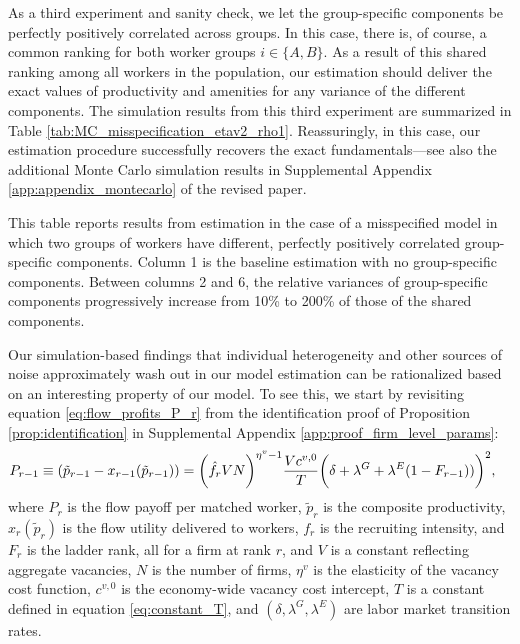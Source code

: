 As a third experiment and sanity check, we let the group-specific components be perfectly positively correlated across groups. In this case, there is, of course, a common ranking for both worker groups $i \in \{ A, B \}$. As a result of this shared ranking among all workers in the population, our estimation should deliver the exact values of productivity and amenities for any variance of the different components. The simulation results from this third experiment are summarized in Table \ref{tab:MC_misspecification_etav2_rho1}. Reassuringly, in this case, our estimation procedure successfully recovers the exact fundamentals---see also the additional Monte Carlo simulation results in Supplemental Appendix \ref{app:appendix_montecarlo} of the revised paper.

%
\begin{table}[htbp!]
    \caption{Estimation under perfectly positively correlated group-specific components}
    \label{tab:MC_misspecification_etav2_rho1}
    \resizebox{\textwidth}{!}{%
    
    }
    \begin{tablenotes}
        \footnotesize
        This table reports results from estimation in the case of a misspecified model in which two groups of workers have different, perfectly positively correlated group-specific components. Column 1 is the baseline estimation with no group-specific components. Between columns 2 and 6, the relative variances of group-specific components progressively increase from 10\% to 200\% of those of the shared components. %
    \end{tablenotes}
\end{table}
%

Our simulation-based findings that individual heterogeneity and other sources of noise approximately wash out in our model estimation can be rationalized based on an interesting property of our model. To see this, we start by revisiting equation \eqref{eq:flow_profits_P_r} from the identification proof of Proposition \ref{prop:identification} in Supplemental Appendix \ref{app:proof_firm_level_params}:
%
\begin{align*}
    P_{r - 1} &\equiv (\tilde{p}_{r - 1} - x_{r - 1}(\tilde{p}_{r - 1})) = \biggl{(} \hat{f}_{r} V N \biggr{)}^{\eta^{v} - 1} \frac{V c^{v,0}}{T} \biggl{(} \delta + \lambda^{G} + \lambda^{E} (1 - F_{r - 1})) \biggr{)}^{2},
\end{align*}
%
where $P_{r}$ is the flow payoff per matched worker, $\tilde{p}_{r}$ is the composite productivity, $x_{r}(\tilde{p}_{r})$ is the flow utility delivered to workers, $f_{r}$ is the recruiting intensity, and $F_{r}$ is the ladder rank, all for a firm at rank $r$, and $V$ is a constant reflecting aggregate vacancies, $N$ is the number of firms, $\eta^{v}$ is the elasticity of the vacancy cost function, $c^{v,0}$ is the economy-wide vacancy cost intercept, $T$ is a constant defined in equation \eqref{eq:constant_T}, and $(\delta, \lambda^{G}, \lambda^{E})$ are labor market transition rates.

